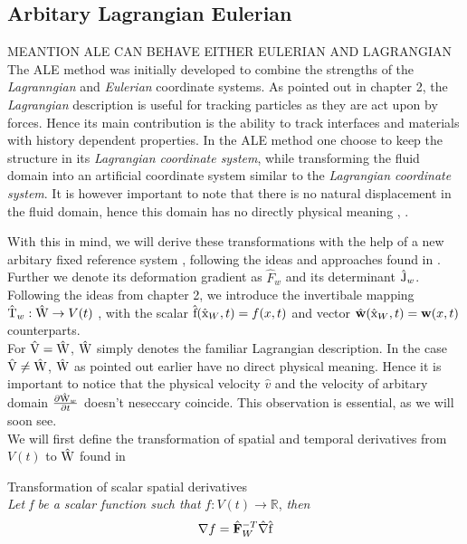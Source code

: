 \subsection{Arbitary Lagrangian Eulerian}
MEANTION ALE CAN  BEHAVE EITHER EULERIAN AND LAGRANGIAN
The ALE method was initially developed to combine the strengths of the \textit{Lagranngian} and \textit{Eulerian} coordinate systems. As pointed out in chapter 2, the \textit{Lagrangian} description is useful for tracking particles as they are act upon by forces. Hence its main contribution is the ability to track interfaces and materials with history dependent properties.
In the ALE method one choose to keep the structure in its \textit{Lagrangian coordinate system}, while transforming the fluid domain into an artificial coordinate system similar to the \textit{Lagrangian coordinate system}. It is however important to note that there is no natural displacement in the fluid domain, hence this domain has no directly physical meaning \cite{Richter2010a}, \cite{Donea2004}. 
 
With this in mind, we will derive these transformations with the help of a new arbitary fixed reference system , following the ideas and approaches found in \cite{Richter2016}. Further we denote its deformation gradient as $\hat{F}_w$ and its determinant $\text{\^{J}}_w$. Following the ideas from chapter 2, we introduce the invertibale mapping $\text{\^{T}}_w : \text{\^{W}} \rightarrow V(t)$ , with the scalar $\text{\^{f}}(\text{\^{x}}_W, t) = f(x,t) $ and vector $\hat{w}(\ha{x}_W, t) = \mathbf{w}(x,t) $ counterparts.\\ 
For $\text{\^{V}} = \text{\^{W}}$, $\text{\^{W}}$ simply denotes the familiar Lagrangian description.
In the case $\text{\^{V}} \neq \text{\^{W}}$, $\text{\^{W}}$ as pointed out earlier have no direct physical meaning.  Hence it is important to notice that the physical velocity $\hat{v}$ and the velocity of arbitary domain $\frac{\partial \text{\^{W}}_w}{\partial t}$ doesn't neseccary coincide. This observation is essential, as we will soon see. \\

We will first define the transformation of spatial and temporal derivatives from $V(t)$ to $\text{\^{W}}$ found in \cite{Richter2016}\\

\begin{lem}
Transformation of scalar spatial derivatives \\
\textit{Let f be a scalar function such that} $f: V(t) \rightarrow \mathbb{R}$, \textit{then} 
\begin{align}
\nabla f = \hat{F}_W^{-T} \hat{\nabla}\ha{f}
\end{align} 
\end{lem}

